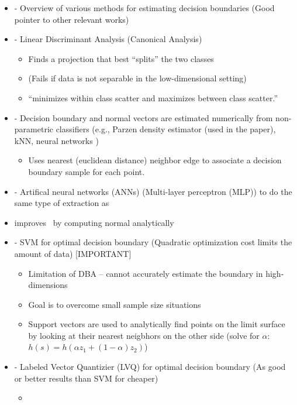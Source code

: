 \documentclass[12pt]{article}
\begin{document}
\begin{itemize}
	\item \cite{DiamantiniPotena2007} - Overview of various methods for estimating decision boundaries (Good pointer to other relevant works)
	\item  \cite{Fukunaga1990,ParkParkPardalos2004} - Linear Discriminant Analysis (Canonical Analysis)
	\begin{itemize}
		\item Finds a projection that best ``splits'' the two classes
		\item (Fails if data is not separable in the low-dimensional setting)
		\item ``minimizes within class scatter and maximizes between class scatter.''
	\end{itemize}
	\item \cite{LeeLandgrebe1993} - Decision boundary and normal vectors are estimated numerically from non-parametric classifiers (e.g., Parzen density estimator (used in the paper), kNN, neural networks )
	\begin{itemize}
		\item Uses nearest (euclidean distance) neighbor edge to associate a decision boundary sample for each point.
	\end{itemize}
	\item \cite{LeeLandgrebe1997} - Artifical neural networks (ANNs) (Multi-layer perceptron (MLP)) to do the same type of extraction as \cite{LeeLandgrebe1993}
	\item \cite{GoLee2003} improves~\cite{LeeLandgrebe1997} by computing normal analytically
	\item \cite{ZhangLiu2005} - SVM for optimal decision boundary (Quadratic optimization cost limits the amount of data) [IMPORTANT]
	\begin{itemize}
		\item Limitation of DBA -- cannot accurately estimate the boundary in high-dimensions
		\item Goal is to overcome small sample size situations
		\item Support vectors are used to analytically find points on the limit surface by looking at their nearest neigbhors
		on the other side (solve for $\alpha$: $h(s) = h(\alpha z_1 + (1 - \alpha) z_2)$)
	\end{itemize}
	\item \cite{DiamantiniPotena2006} - Labeled Vector Quantizier (LVQ) for optimal decision boundary (As good or better results than SVM for cheaper)
	\begin{itemize}
		\item 
	\end{itemize}
\end{itemize}
\end{document}
